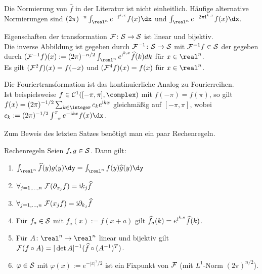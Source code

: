\begin{Bem}
    Die Normierung von $\widehat{f}$ in der Literatur ist nicht einheitlich.
    Häufige alternative Normierungen sind
    $(2\pi)^{-n} \int_{\real^n} e^{-\iu\sp{k,x}} f(x)\dx$ und
    $\int_{\real^n} e^{-2\pi\iu\sp{k,x}} f(x)\dx$.
\end{Bem}

\begin{Satz}{Eigenschaften der transformation}
    $\F\colon \S \rightarrow \S$ ist linear und bijektiv.\\
    Die inverse Abbildung ist gegeben durch $\F^{-1}\colon \S \rightarrow \S$ mit
    $\F^{-1} f \in \S$ der  gegeben durch
    $(\F^{-1} f)(x) := (2\pi)^{-n/2} \int_{\real^n} e^{\iu\sp{k,x}} \widehat{f}(k)dk$
    für $x \in \real^n$.\\
    Es gilt $(\F^2 f)(x) = f(-x)$ und $(\F^4 f)(x) = f(x)$ für $x \in \real^n$.
\end{Satz}

\begin{Bem}
    Die Fouriertransformation ist das kontinuierliche Analog zu Fourierreihen.\\
    Ist beispielsweise $f \in \C^1([-\pi,\pi], \complex)$ mit $f(-\pi) = f(\pi)$,
    so gilt $f(x) = (2\pi)^{-1/2} \sum_{k \in \integer} c_k e^{\iu kx}$ gleichmäßig auf
    $[-\pi, \pi]$, wobei $c_k := (2\pi)^{-1/2} \int_{-\pi}^\pi e^{-\iu kx} f(x)\dx$.
\end{Bem}

\linie

\begin{Bem}
    Zum Beweis des letzten Satzes benötigt man ein paar Rechenregeln.
\end{Bem}

\begin{Satz}{Rechenregeln}
    Seien $f, g \in \S$.
    Dann gilt:
    \begin{enumerate}
        \item
        $\int_{\real^n} \widehat{f}(y)g(y)\dy = \int_{\real^n} f(y)\widehat{g}(y)\dy$

        \item
        $\forall_{j=1,\dotsc,n}\;
        \F(\partial_{x_j} f) = \iu k_j \widehat{f}$

        \item
        $\forall_{j=1,\dotsc,n}\;
        \F(x_j f) = \iu \partial_{k_j} \widehat{f}$

        \item
        Für $f_a \in \S$ mit $f_a(x) := f(x + a)$ gilt
        $\widehat{f_a}(k) = e^{\iu\sp{k,a}} \widehat{f}(k)$.

        \item
        Für $A\colon \real^n \rightarrow \real^n$ linear und bijektiv gilt
        $\F(f \circ A) = |\det A|^{-1} (\widehat{f} \circ (A^{-1})^T)$.

        \item
        $\varphi \in \S$ mit $\varphi(x) := e^{-|x|^2/2}$ ist ein Fixpunkt von $\F$
        (mit $L^1$-Norm $(2\pi)^{n/2}$).
    \end{enumerate}
\end{Satz}

